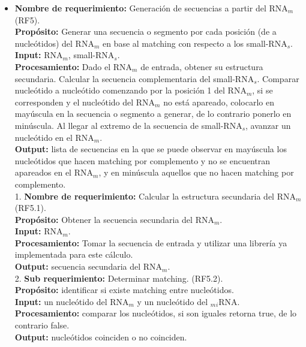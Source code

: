 \documentclass[12pt,a4paper,spanish]{article}
\begin{document}
\begin{itemize}
		\item \textbf{Nombre de requerimiento:} Generación de secuencias a partir del RNA$_m$ (RF5).\\
 	    \textbf{Propósito:} Generar una secuencia o segmento por cada posición (de a nucleótidos) del RNA$_m$ en base al 								matching con respecto a los small-RNA$_s$.\\ 
		\textbf{Input:} RNA$_m$, small-RNA$_s$. \\
		\textbf{Procesamiento:} Dado el RNA$_m$ de entrada, obtener su estructura secundaria. Calcular la secuencia 								complementaria del small-RNA$_s$. Comparar nucleótido a nucleótido comenzando por la 									posición 1 del RNA$_m$, si se corresponden y el nucleótido del RNA$_m$ no está apareado, 									colocarlo en mayúscula en la secuencia o segmento a generar, de lo 									contrario ponerlo en minúscula. Al llegar al extremo de la secuencia de small-RNA$_s$, 									avanzar un nucleótido en el RNA$_m$. \\							
		\textbf{Output:} lista de secuencias en la que se puede observar en mayúscula los nucleótidos que 							hacen matching por complemento y no se encuentran apareados en el RNA$_m$, y en minúscula aquellos 							que no hacen matching por complemento.\\

		1. \textbf{Nombre de requerimiento:} Calcular la estructura secundaria del RNA$_m$ (RF5.1).\\
 	    \textbf{Propósito:} Obtener la secuencia secundaria del RNA$_m$.\\
		\textbf{Input:}  RNA$_m$.\\
		\textbf{Procesamiento:} Tomar la secuencia de entrada y utilizar una librería ya implementada para este cálculo.\\
		\textbf{Output:}  secuencia secundaria del RNA$_m$.\\

		2. \textbf{Sub requerimiento:} Determinar matching. (RF5.2).\\
 	    \textbf{Propósito:} identificar si existe matching entre nucleótidos. \\
		\textbf{Input:} un nucleótido del RNA$_m$ y un nucleótido del $_m$$_i$RNA. \\
		\textbf{Procesamiento:} comparar los nucleótidos, si son iguales retorna true, de lo contrario false. \\
		\textbf{Output:} nucleótidos coinciden o no coinciden.\\


\end{itemize}
\end{document}
